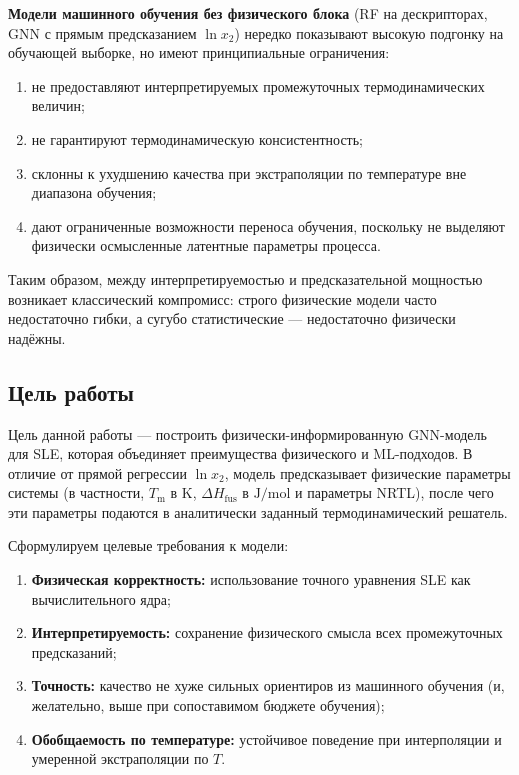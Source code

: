 \documentclass[11pt]{article}
\begin{document}
\textbf{Модели машинного обучения без физического блока} (RF на дескрипторах, GNN с прямым предсказанием $\ln x_2$) нередко показывают высокую подгонку на обучающей выборке, но имеют принципиальные ограничения:

\begin{enumerate}
  \item не предоставляют интерпретируемых промежуточных термодинамических величин;
  \item не гарантируют термодинамическую консистентность;
  \item склонны к ухудшению качества при экстраполяции по температуре вне диапазона обучения;
  \item дают ограниченные возможности переноса обучения, поскольку не выделяют физически осмысленные латентные параметры процесса.
\end{enumerate}

Таким образом, между интерпретируемостью и предсказательной мощностью возникает классический компромисс: строго физические модели часто недостаточно гибки, а сугубо статистические --- недостаточно физически надёжны.

\subsection{Цель работы}

Цель данной работы --- построить физически-информированную GNN-модель для SLE, которая объединяет преимущества физического и ML-подходов. В отличие от прямой регрессии $\ln x_2$, модель предсказывает физические параметры системы (в частности, $T_{\mathrm{m}}$ в $\mathrm{K}$, $\Delta H_{\mathrm{fus}}$ в $\mathrm{J/mol}$ и параметры NRTL), после чего эти параметры подаются в аналитически заданный термодинамический решатель.

Сформулируем целевые требования к модели:

\begin{enumerate}
  \item \textbf{Физическая корректность:} использование точного уравнения SLE как вычислительного ядра;
  \item \textbf{Интерпретируемость:} сохранение физического смысла всех промежуточных предсказаний;
  \item \textbf{Точность:} качество не хуже сильных ориентиров из машинного обучения (и, желательно, выше при сопоставимом бюджете обучения);
  \item \textbf{Обобщаемость по температуре:} устойчивое поведение при интерполяции и умеренной экстраполяции по $T$.
\end{enumerate}
\end{document}
